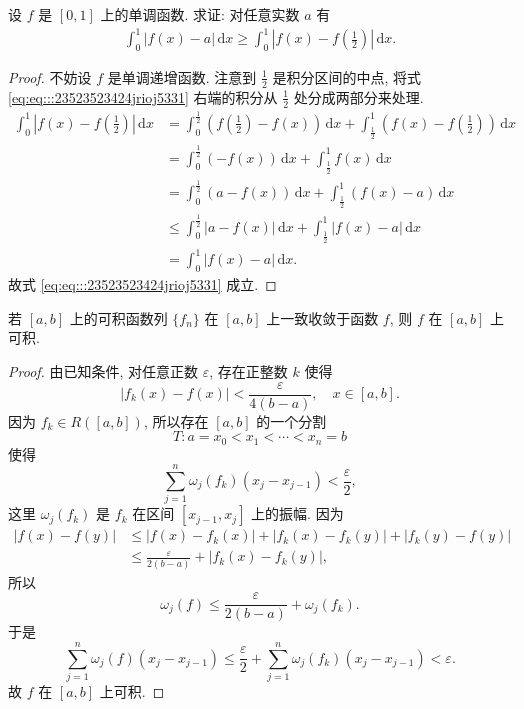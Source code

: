 \documentclass[../../main.tex]{subfiles}
\begin{document}
\begin{proposition}\label{proposition:单调函数减任意常数积分小于减其中点的积分}
设 $f$ 是 $[0,1]$ 上的单调函数. 求证: 对任意实数 $a$ 有
\begin{align}\label{eq:eq:::23523523424jrioj5331}
\int_{0}^{1}|f(x)-a|\,\mathrm{d}x\geqslant\int_{0}^{1}\left|f(x)-f\left(\frac{1}{2}\right)\right|\,\mathrm{d}x.
\end{align}
\end{proposition}
\begin{proof}
不妨设 $f$ 是单调递增函数. 注意到 $\frac{1}{2}$ 是积分区间的中点, 将式 \eqref{eq:eq:::23523523424jrioj5331} 右端的积分从 $\frac{1}{2}$ 处分成两部分来处理.
\begin{align*}
\int_{0}^{1}\left|f(x)-f\left(\frac{1}{2}\right)\right|\,\mathrm{d}x&=\int_{0}^{\frac{1}{2}}\left(f\left(\frac{1}{2}\right)-f(x)\right)\,\mathrm{d}x+\int_{\frac{1}{2}}^{1}\left(f(x)-f\left(\frac{1}{2}\right)\right)\,\mathrm{d}x\\
&=\int_{0}^{\frac{1}{2}}(-f(x))\,\mathrm{d}x+\int_{\frac{1}{2}}^{1}f(x)\,\mathrm{d}x\\
&=\int_{0}^{\frac{1}{2}}(a-f(x))\,\mathrm{d}x+\int_{\frac{1}{2}}^{1}(f(x)-a)\,\mathrm{d}x\\
&\leqslant\int_{0}^{\frac{1}{2}}|a-f(x)|\,\mathrm{d}x+\int_{\frac{1}{2}}^{1}|f(x)-a|\,\mathrm{d}x\\
&=\int_{0}^{1}|f(x)-a|\,\mathrm{d}x.
\end{align*}
故式 \eqref{eq:eq:::23523523424jrioj5331} 成立.

\end{proof}

\begin{example}
若 $[a,b]$ 上的可积函数列 $\{f_n\}$ 在 $[a,b]$ 上一致收敛于函数 $f$, 则 $f$ 在 $[a,b]$ 上可积.
\end{example}
\begin{proof}
由已知条件, 对任意正数 $\varepsilon$, 存在正整数 $k$ 使得
$$|f_k(x)-f(x)|<\frac{\varepsilon}{4(b-a)}, \quad x \in[a,b].$$
因为 $f_k \in R([a,b])$, 所以存在 $[a,b]$ 的一个分割
$$T: a=x_0<x_1<\cdots<x_n=b$$
使得
$$\sum_{j=1}^n \omega_j(f_k)(x_j-x_{j-1})<\frac{\varepsilon}{2},$$
这里 $\omega_j(f_k)$ 是 $f_k$ 在区间 $[x_{j-1},x_j]$ 上的振幅. 因为
$$
\begin{aligned}
|f(x)-f(y)| & \leqslant |f(x)-f_k(x)|+\left|f_k(x)-f_k(y)\right|+\left|f_k(y)-f(y)\right| \\
& \leqslant  \frac{\varepsilon}{2(b-a)}+\left|f_k(x)-f_k(y)\right|,
\end{aligned}
$$
所以
$$\omega_j(f) \leqslant  \frac{\varepsilon}{2(b-a)}+\omega_j(f_k).$$
于是
$$\sum_{j=1}^n \omega_j(f)\left(x_j-x_{j-1}\right) \leqslant  \frac{\varepsilon}{2}+\sum_{j=1}^n \omega_j\left(f_k\right)\left(x_j-x_{j-1}\right)<\varepsilon.$$
故 $f$ 在 $[a,b]$ 上可积.

\end{proof}
\end{document}
